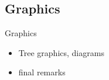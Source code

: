 \subsection{Graphics}
\begin{frame}{Graphics}
  \begin{itemize}
    \item Tree graphics, diagrams
\N
    \item final remarks
% 
  \end{itemize}
%
\N\N
\end{frame}







% 


